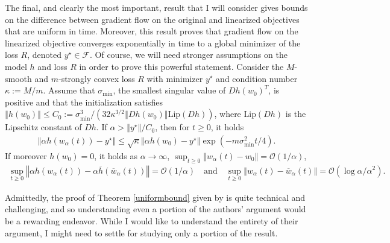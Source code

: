 \documentclass{article}
\newenvironment{manualtheorem}[1]{%
  \renewcommand\themanualtheoreminner{#1}%
  \manualtheoreminner
}{\endmanualtheoreminner}
\begin{document}
The final, and clearly the most important, result that I will consider gives bounds on the difference between gradient flow on the original and linearized objectives that are uniform in time. Moreover, this result proves that gradient flow on the linearized objective converges exponentially in time to a global minimizer of the loss $R$, denoted $y^{\star} \in \mathcal{F}$. Of course, we will need stronger assumptions on the model $h$ and loss $R$ in order to prove this powerful statement. 
\begin{manualtheorem}{2.4}\label{uniformbound}
Consider the $M$-smooth and $m$-strongly convex loss $R$ with minimizer $y^{\star}$ and condition number $\kappa := M/m$. Assume that $\sigma_{\text{min}}$, the smallest singular value of $Dh(w_0)^T$, is positive and that the initialization satisfies $\left\Vert h(w_0) \right\Vert \leq C_0:= \sigma_{\text{min}}^3/(32\kappa^{3/2} \left\Vert Dh(w_0) \right\Vert \text{Lip}(Dh))$, where $\text{Lip}(Dh)$ is the Lipschitz constant of $Dh$. If $\alpha > \left\Vert y^{\star} \right\Vert / C_0$, then for $t \geq 0$, it holds
\begin{align*}
    \left\Vert \alpha h(w_{\alpha}(t)) - y^{\star} \right\Vert \leq \sqrt{\kappa} \left\Vert \alpha h(w_0) - y^{\star} \right\Vert \exp( -m \sigma_{\text{min}}^2 t/4).
\end{align*}
If moreover $h(w_0) = 0$, it holds as $\alpha \rightarrow \infty$, $\sup_{t \geq 0} \left\Vert w_{\alpha}(t) - w_0 \right\Vert = \mathcal{O}(1/\alpha)$,
\begin{align*}
    \sup_{t \geq 0} \left\Vert \alpha h(w_{\alpha}(t)) - \alpha \overline{h}(\overline{w}_{\alpha}(t)) \right\Vert = \mathcal{O}(1/\alpha) \quad \text{and} \quad  \sup_{t \geq 0} \left\Vert w_{\alpha}(t) - \overline{w}_{\alpha}(t) \right\Vert = \mathcal{O}(\log \alpha/\alpha^2).
\end{align*}
\end{manualtheorem}

Admittedly, the proof of Theorem \ref{uniformbound} given by \cite{chizat2018lazy} is quite technical and challenging, and so understanding even a portion of the authors' argument would be a rewarding endeavor. While I would like to understand the entirety of their argument, I might need to settle for studying only a portion of the result.


\pagebreak


\end{document}
